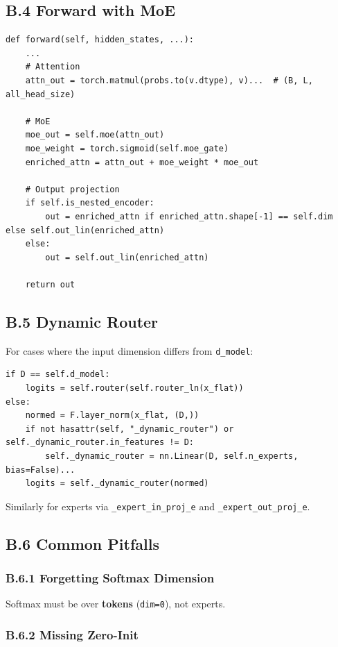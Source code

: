 \subsection{B.4 Forward with MoE}

\begin{lstlisting}
def forward(self, hidden_states, ...):
    ...
    # Attention
    attn_out = torch.matmul(probs.to(v.dtype), v)...  # (B, L, all_head_size)
    
    # MoE
    moe_out = self.moe(attn_out)
    moe_weight = torch.sigmoid(self.moe_gate)
    enriched_attn = attn_out + moe_weight * moe_out
    
    # Output projection
    if self.is_nested_encoder:
        out = enriched_attn if enriched_attn.shape[-1] == self.dim else self.out_lin(enriched_attn)
    else:
        out = self.out_lin(enriched_attn)
    
    return out
\end{lstlisting}

\subsection{B.5 Dynamic Router}

For cases where the input dimension differs from \texttt{d\_model}:

\begin{lstlisting}
if D == self.d_model:
    logits = self.router(self.router_ln(x_flat))
else:
    normed = F.layer_norm(x_flat, (D,))
    if not hasattr(self, "_dynamic_router") or self._dynamic_router.in_features != D:
        self._dynamic_router = nn.Linear(D, self.n_experts, bias=False)...
    logits = self._dynamic_router(normed)
\end{lstlisting}

Similarly for experts via \texttt{\_expert\_in\_proj\_{e}} and \texttt{\_expert\_out\_proj\_{e}}.

\subsection{B.6 Common Pitfalls}

\subsubsection{B.6.1 Forgetting Softmax Dimension}

Softmax must be over \textbf{tokens} (\texttt{dim=0}), not experts.

\subsubsection{B.6.2 Missing Zero-Init}

